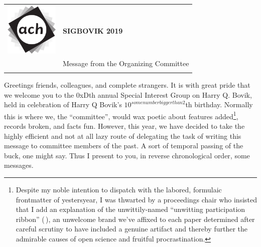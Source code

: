 \documentclass[12pt]{article}
\begin{document}
{\sffamily
\begin{tabular}{ll}
\multirow{3}{*}{\includegraphics[width=1in]{ach.png}}\\
& \textbf{\Huge{SIGBOVIK 2019}} \\ &\\
& \LARGE{Message from the Organizing Committee} \\
&\\
\hline
\end{tabular}}
\vspace{2em}
\thispagestyle{empty}

Greetings friends, colleagues, and complete strangers. It is with great pride that we welcome you to the 0xDth annual Special Interest Group on Harry Q. Bovik, held in celebration of Harry Q Bovik's $10^{somenumberbiggerthan2}$th birthday. Normally this is where we, the ``committee'', would wax poetic about  features added\footnote{Despite my noble intention to dispatch with the labored, formulaic frontmatter of yestersyear, I was thwarted by a proceedings chair who insisted that I add an explanation of the unwittily-named ``unwitting participation ribbon'' (\,), an unwelcome brand we've affixed to each paper determined after careful scrutiny to have included a genuine artifact and thereby further the admirable causes of open science and fruitful procrastination.}, records broken, and facts fun. However, this year, we have decided to take the highly efficient and not at all lazy route of delegating the task of writing this message to committee members of the past. A sort of temporal passing of the buck, one might say. Thus I present to you, in reverse chronological order, some messages.
\end{document}
